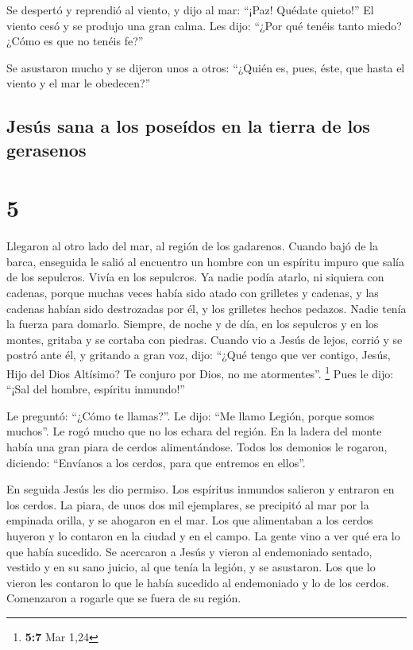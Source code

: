  Se despertó y reprendió al viento, y dijo al mar:
``¡Paz! Quédate quieto!'' El viento cesó y se produjo una gran calma.
 Les dijo: ``¿Por qué tenéis tanto miedo? ¿Cómo es que no
tenéis fe?''

 Se asustaron mucho y se dijeron unos a otros: ``¿Quién
es, pues, éste, que hasta el viento y el mar le obedecen?''

\hypertarget{jesuxfas-sana-a-los-poseuxeddos-en-la-tierra-de-los-gerasenos}{%
\subsection{Jesús sana a los poseídos en la tierra de los
gerasenos}\label{jesuxfas-sana-a-los-poseuxeddos-en-la-tierra-de-los-gerasenos}}

\hypertarget{section-4}{%
\section{5}\label{section-4}}

 Llegaron al otro lado del mar, al región de los
gadarenos.  Cuando bajó de la barca, enseguida le salió al
encuentro un hombre con un espíritu impuro que salía de los sepulcros.
 Vivía en los sepulcros. Ya nadie podía atarlo, ni
siquiera con cadenas,  porque muchas veces había sido
atado con grilletes y cadenas, y las cadenas habían sido destrozadas por
él, y los grilletes hechos pedazos. Nadie tenía la fuerza para domarlo.
 Siempre, de noche y de día, en los sepulcros y en los
montes, gritaba y se cortaba con piedras.  Cuando vio a
Jesús de lejos, corrió y se postró ante él,  y gritando a
gran voz, dijo: ``¿Qué tengo que ver contigo, Jesús, Hijo del Dios
Altísimo? Te conjuro por Dios, no me atormentes''. \footnote{\textbf{5:7}
  Mar 1,24}  Pues le dijo: ``¡Sal del hombre, espíritu
inmundo!''

 Le preguntó: ``¿Cómo te llamas?''. Le dijo: ``Me llamo
Legión, porque somos muchos''.  Le rogó mucho que no los
echara del región.  En la ladera del monte había una gran
piara de cerdos alimentándose.  Todos los demonios le
rogaron, diciendo: ``Envíanos a los cerdos, para que entremos en
ellos''.

 En seguida Jesús les dio permiso. Los espíritus inmundos
salieron y entraron en los cerdos. La piara, de unos dos mil ejemplares,
se precipitó al mar por la empinada orilla, y se ahogaron en el mar.
 Los que alimentaban a los cerdos huyeron y lo contaron
en la ciudad y en el campo. La gente vino a ver qué era lo que había
sucedido.  Se acercaron a Jesús y vieron al endemoniado
sentado, vestido y en su sano juicio, al que tenía la legión, y se
asustaron.  Los que lo vieron les contaron lo que le
había sucedido al endemoniado y lo de los cerdos. 
Comenzaron a rogarle que se fuera de su región.

